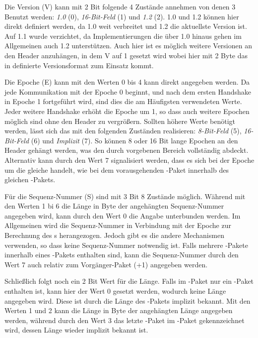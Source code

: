 Die Version (V) kann mit 2 Bit folgende 4 Zustände annehmen von denen 3 Benutzt werden: \textit{ 1.0} (0), \textit{16-Bit-Feld} (1) und
\textit{ 1.2} (2).  1.0 und  1.2 können hier direkt definiert werden, da  1.0 weit verbreitet
 und  1.2 die aktuellste Version ist. Auf  1.1 wurde verzichtet, da Implementierungen die über  1.0 hinaus gehen im Allgemeinen auch
 1.2 unterstützen. Auch hier ist es möglich weitere Versionen an den Header anzuhängen, in dem V auf 1 gesetzt wird wobei hier mit 2 Byte das in 
definierte Versionsformat zum Einsatz kommt.

Die Epoche (E) kann mit den Werten 0 bis 4 kann direkt angegeben werden. Da jede Kommunikation mit der Epoche 0 beginnt, und
nach dem ersten Handshake in Epoche 1 fortgeführt wird, sind dies die am Häufigsten verwendeten Werte. Jeder weitere Handshake erhöht die Epoche um 1, so dass auch
weitere Epochen möglich sind ohne den Header zu vergrößern. Sollten höhere Werte benötigt werden, lässt sich das mit den folgenden Zuständen realisieren:
\textit{8-Bit-Feld} (5), \textit{16-Bit-Feld} (6) und \textit{Implizit} (7). So können 8 oder 16 Bit lange Epochen an den Header gehängt werden, was den
durch  vorgebenen Bereich vollständig abdeckt. Alternativ kann durch den Wert 7 signalisiert werden, dass es sich bei der Epoche um die gleiche
handelt, wie bei dem vorausgehenden -Paket innerhalb des gleichen -Pakets.

Für die Sequenz-Nummer (S) sind mit 3 Bit 8 Zustände möglich. Während mit den Werten 1 bi 6 die Länge in Byte der angehängten Sequenz-Nummer angegeben wird,
kann durch den Wert 0 die Angabe unterbunden werden. Im Allgemeinen wird die Sequenz-Nummer in Verbindung mit der Epoche zur Berechnung des s herangezogen.
Jedoch gibt es  die andere Mechanismen verwenden, so dass keine Sequenz-Nummer notwendig ist. Falls mehrere -Pakete innerhalb eines
-Pakets enthalten sind, kann die Sequenz-Nummer durch den Wert 7 auch relativ zum Vorgänger-Paket (+1) angegeben werden.

Schließlich folgt noch ein 2 Bit Wert für die Länge. Falls im -Paket nur ein -Paket enthalten ist, kann hier der Wert 0 gesetzt werden, wodurch
keine Länge angegeben wird. Diese ist durch die Länge des -Pakets implizit bekannt. Mit den Werten 1 und 2 kann die Länge in Byte der angehängten Länge
angegeben werden, während durch den Wert 3 das letzte -Paket im -Paket gekennzeichnet wird, dessen Länge wieder implizit bekannt ist.